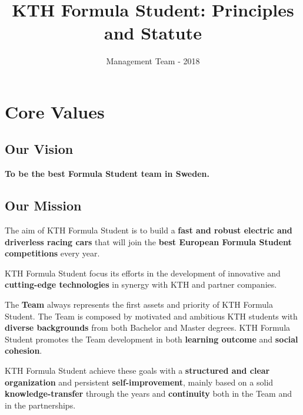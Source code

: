\documentclass[graybox]{svmult}
\begin{document}

\title*{KTH Formula Student: Principles and Statute}

\author{Management Team - 2018}

\maketitle

\section{Core Values}
\label{sec:2}

\subsection*{Our Vision}

\begin{center}
\Large{{\textbf{To be the best Formula Student team in Sweden.}}}
\end{center}
 
\subsection*{Our Mission}
\large{{The aim of KTH Formula Student is to build a \textbf{fast and robust electric and driverless racing cars} that will join the \textbf{best European Formula Student competitions} every year.

KTH Formula Student focus its efforts in the development of innovative and \textbf{cutting-edge technologies} in synergy with KTH and partner companies.

The \textbf{Team} always represents the first assets and priority of KTH Formula Student. The Team is composed by motivated and ambitious KTH students with \textbf{diverse backgrounds} from both Bachelor and Master degrees. KTH Formula Student promotes the Team development in both \textbf{learning outcome} and \textbf{social cohesion}.

KTH Formula Student achieve these goals with a \textbf{structured and clear organization} and persistent \textbf{self-improvement}, mainly based on a solid \textbf{knowledge-transfer} through the years and \textbf{continuity} both in the Team and in the partnerships.
}}
\end{document}
